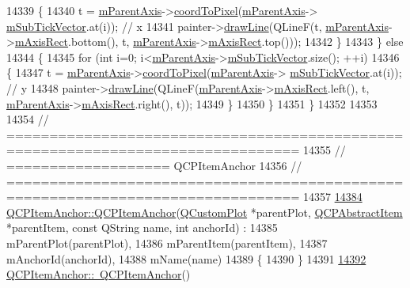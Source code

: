\begin{DoxyCode}
14339     \{
14340       t = \hyperlink{a00116_aea80007cf54320e192a69054cd81504b}{mParentAxis}->\hyperlink{a00025_a985ae693b842fb0422b4390fe36d299a}{coordToPixel}(\hyperlink{a00116_aea80007cf54320e192a69054cd81504b}{mParentAxis}->
      \hyperlink{a00025_a28353081e0ff35c3fe5ced923a287faa}{mSubTickVector}.at(i)); \textcolor{comment}{// x}
14341       painter->\hyperlink{a00047_a0b4b1b9bd495e182c731774dc800e6e0}{drawLine}(QLineF(t, \hyperlink{a00116_aea80007cf54320e192a69054cd81504b}{mParentAxis}->\hyperlink{a00025_ad63d51f30f835f3a568b6231362ed4a0}{mAxisRect}.bottom(), t, 
      \hyperlink{a00116_aea80007cf54320e192a69054cd81504b}{mParentAxis}->\hyperlink{a00025_ad63d51f30f835f3a568b6231362ed4a0}{mAxisRect}.top()));
14342     \}
14343   \} \textcolor{keywordflow}{else}
14344   \{
14345     \textcolor{keywordflow}{for} (\textcolor{keywordtype}{int} i=0; i<\hyperlink{a00116_aea80007cf54320e192a69054cd81504b}{mParentAxis}->\hyperlink{a00025_a28353081e0ff35c3fe5ced923a287faa}{mSubTickVector}.size(); ++i)
14346     \{
14347       t = \hyperlink{a00116_aea80007cf54320e192a69054cd81504b}{mParentAxis}->\hyperlink{a00025_a985ae693b842fb0422b4390fe36d299a}{coordToPixel}(\hyperlink{a00116_aea80007cf54320e192a69054cd81504b}{mParentAxis}->
      \hyperlink{a00025_a28353081e0ff35c3fe5ced923a287faa}{mSubTickVector}.at(i)); \textcolor{comment}{// y}
14348       painter->\hyperlink{a00047_a0b4b1b9bd495e182c731774dc800e6e0}{drawLine}(QLineF(\hyperlink{a00116_aea80007cf54320e192a69054cd81504b}{mParentAxis}->\hyperlink{a00025_ad63d51f30f835f3a568b6231362ed4a0}{mAxisRect}.left(), t, 
      \hyperlink{a00116_aea80007cf54320e192a69054cd81504b}{mParentAxis}->\hyperlink{a00025_ad63d51f30f835f3a568b6231362ed4a0}{mAxisRect}.right(), t));
14349     \}
14350   \}
14351 \}
14352 
14353 
14354 \textcolor{comment}{// ================================================================================}
14355 \textcolor{comment}{// =================== QCPItemAnchor}
14356 \textcolor{comment}{// ================================================================================}
14357 
\hypertarget{a00115_source_l14384}{}\hyperlink{a00032_aeb6b681d2bf324db40a915d32ec5624f}{14384} \hyperlink{a00032_aeb6b681d2bf324db40a915d32ec5624f}{QCPItemAnchor::QCPItemAnchor}(\hyperlink{a00030_d8/d00/a00186}{QCustomPlot} *parentPlot, 
      \hyperlink{a00022}{QCPAbstractItem} *parentItem, \textcolor{keyword}{const} QString name, \textcolor{keywordtype}{int} anchorId) :
14385   mParentPlot(parentPlot),
14386   mParentItem(parentItem),
14387   mAnchorId(anchorId),
14388   mName(name)
14389 \{
14390 \}
14391 
\hypertarget{a00115_source_l14392}{}\hyperlink{a00032_a1868559407600688ee4d1a4621e81ceb}{14392} \hyperlink{a00032_a1868559407600688ee4d1a4621e81ceb}{QCPItemAnchor::~QCPItemAnchor}()

\end{DoxyCode}
